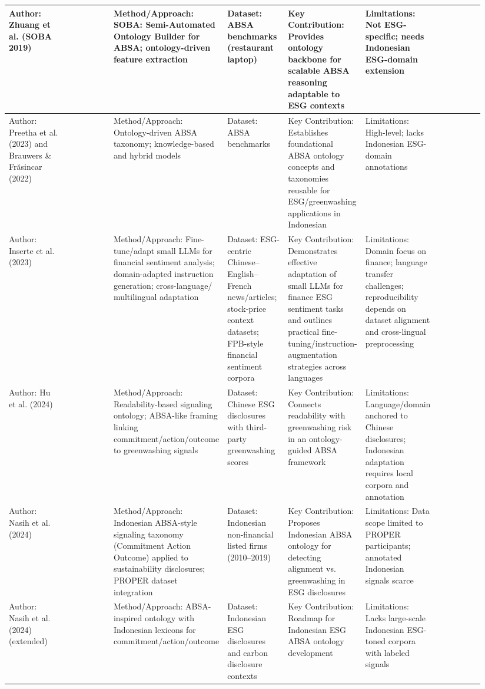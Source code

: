 \documentclass{article}
\begin{document}
\begin{landscape}
\begin{longtable}{p{0.134\linewidth} p{0.134\linewidth} p{0.134\linewidth} p{0.134\linewidth} p{0.134\linewidth} p{0.134\linewidth} p{0.134\linewidth}}
Author: Zhuang et al. (SOBA 2019) & ~ & Method/Approach: SOBA: Semi-Automated Ontology Builder for ABSA; ontology-driven feature extraction & Dataset: ABSA benchmarks (restaurant laptop) & Key Contribution: Provides ontology backbone for scalable ABSA reasoning adaptable to ESG contexts & Limitations: Not ESG-specific; needs Indonesian ESG-domain extension \\ \hline
Author: Preetha et al. (2023) and Brauwers \& Frăsincar (2022) & ~ & Method/Approach: Ontology-driven ABSA taxonomy; knowledge-based and hybrid models & Dataset: ABSA benchmarks & Key Contribution: Establishes foundational ABSA ontology concepts and taxonomies reusable for ESG/greenwashing applications in Indonesian & Limitations: High-level; lacks Indonesian ESG-domain annotations \\ \hline
Author: Inserte et al. (2023) & ~ & Method/Approach: Fine-tune/adapt small LLMs for financial sentiment analysis; domain-adapted instruction generation; cross-language/ multilingual adaptation & Dataset: ESG-centric Chinese–English–French news/articles; stock-price context datasets; FPB-style financial sentiment corpora & Key Contribution: Demonstrates effective adaptation of small LLMs for finance ESG sentiment tasks and outlines practical fine-tuning/instruction-augmentation strategies across languages & Limitations: Domain focus on finance; language transfer challenges; reproducibility depends on dataset alignment and cross-lingual preprocessing \\ \hline
Author: Hu et al. (2024) & ~ & Method/Approach: Readability-based signaling ontology; ABSA-like framing linking commitment/action/outcome to greenwashing signals & Dataset: Chinese ESG disclosures with third-party greenwashing scores & Key Contribution: Connects readability with greenwashing risk in an ontology-guided ABSA framework & Limitations: Language/domain anchored to Chinese disclosures; Indonesian adaptation requires local corpora and annotation \\ \hline
Author: Nasih et al. (2024) & ~ & Method/Approach: Indonesian ABSA-style signaling taxonomy (Commitment Action Outcome) applied to sustainability disclosures; PROPER dataset integration & Dataset: Indonesian non-financial listed firms (2010–2019) & Key Contribution: Proposes Indonesian ABSA ontology for detecting alignment vs. greenwashing in ESG disclosures & Limitations: Data scope limited to PROPER participants; annotated Indonesian signals scarce \\ \hline
Author: Nasih et al. (2024) (extended) & ~ & Method/Approach: ABSA-inspired ontology with Indonesian lexicons for commitment/action/outcome & Dataset: Indonesian ESG disclosures and carbon disclosure contexts & Key Contribution: Roadmap for Indonesian ESG ABSA ontology development & Limitations: Lacks large-scale Indonesian ESG-toned corpora with labeled signals \\ \hline

\end{longtable}
\end{landscape}
\end{document}

